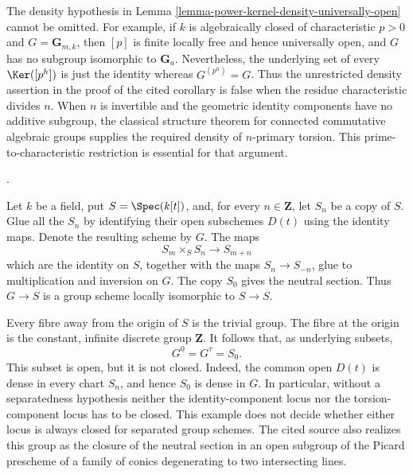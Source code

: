 \begin{remark}
\label{remark-power-kernel-density-characteristic}
The density hypothesis in
Lemma \ref{lemma-power-kernel-density-universally-open} cannot be omitted.
For example, if $k$ is algebraically closed of characteristic $p > 0$ and
$G = \mathbf{G}_{m,k}$, then $[p]$ is finite locally free and hence
universally open, and $G$ has no subgroup isomorphic to $\mathbf{G}_a$.
Nevertheless, the underlying set of every $\Ker([p^h])$ is just
the identity whereas $G^{(p^h)}=G$. Thus the unrestricted density assertion
in the proof of the cited corollary is false when the residue characteristic
divides $n$. When $n$ is invertible and the geometric identity components
have no additive subgroup, the classical structure theorem for connected
commutative algebraic groups supplies the required density of $n$-primary
torsion. This prime-to-characteristic restriction is essential for that
argument.
\end{remark}

\begin{example}
\label{example-nonseparated-component-loci-not-closed}
\begin{reference}
\cite[Expos\'e 236, Remark 1.9, pp. 229--230]{FGA}.
\end{reference}
Let $k$ be a field, put $S=\Spec(k[t])$, and, for every $n\in\mathbf Z$,
let $S_n$ be a copy of $S$. Glue all the $S_n$ by identifying their open
subschemes $D(t)$ using the identity maps. Denote the resulting scheme by
$G$. The maps
$$
S_m\times_S S_n\longrightarrow S_{m+n}
$$
which are the identity on $S$, together with the maps
$S_n\to S_{-n}$, glue to multiplication and inversion on $G$. The copy
$S_0$ gives the neutral section. Thus $G\to S$ is a group scheme locally
isomorphic to $S\to S$.

Every fibre away from the origin of $S$ is the trivial group. The fibre at
the origin is the constant, infinite discrete group $\mathbf Z$. It follows
that, as underlying subsets,
$$
G^0=G^\tau=S_0.
$$
This subset is open, but it is not closed. Indeed, the common open $D(t)$ is
dense in every chart $S_n$, and hence $S_0$ is dense in $G$. In particular,
without a separatedness hypothesis neither the identity-component locus nor
the torsion-component locus has to be closed. This example does not decide
whether either locus is always closed for separated group schemes. The cited
source also realizes this group as the closure of the neutral section in an
open subgroup of the Picard prescheme of a family of conics degenerating to
two intersecting lines.
\end{example}

